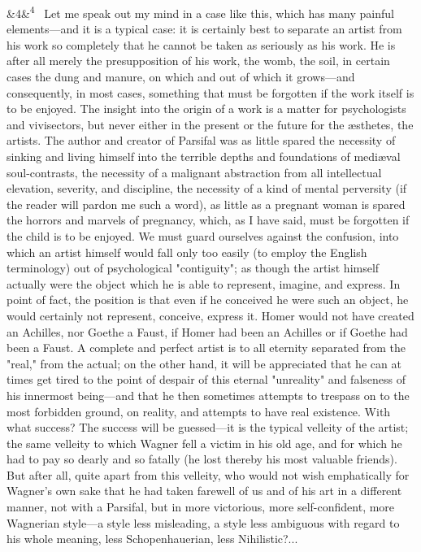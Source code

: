\documentclass[12pt]{article}
\newcommand{\para}[1][]{\par\noindent\ifx&#1&\else\textsuperscript{\footnotesize #1}~\fi}
\begin{document}
\para[4] Let me speak out my mind in a case like this, which has many painful elements---and it is a typical case: it is certainly best to separate an artist from his work so completely that he cannot be taken as seriously as his work. He is after all merely the presupposition of his work, the womb, the soil, in certain cases the dung and manure, on which and out of which it grows---and consequently, in most cases, something that must be forgotten if the work itself is to be enjoyed. The insight into the origin of a work is a matter for psychologists and vivisectors, but never either in the present or the future for the æsthetes, the artists. The author and creator of Parsifal was as little spared the necessity of sinking and living himself into the terrible depths and foundations of mediæval soul-contrasts, the necessity of a malignant abstraction from all intellectual elevation, severity, and discipline, the necessity of a kind of mental perversity (if the reader will pardon me such a word), as little as a pregnant woman is spared the horrors and marvels of pregnancy, which, as I have said, must be forgotten if the child is to be enjoyed. We must guard ourselves against the confusion, into which an artist himself would fall only too easily (to employ the English terminology) out of psychological "contiguity"; as though the artist himself actually were the object which he is able to represent, imagine, and express. In point of fact, the position is that even if he conceived he were such an object, he would certainly not represent, conceive, express it. Homer would not have created an Achilles, nor Goethe a Faust, if Homer had been an Achilles or if Goethe had been a Faust. A complete and perfect artist is to all eternity separated from the "real," from the actual; on the other hand, it will be appreciated that he can at times get tired to the point of despair of this eternal "unreality" and falseness of his innermost being---and that he then sometimes attempts to trespass on to the most forbidden ground, on reality, and attempts to have real existence. With what success? The success will be guessed---it is the typical velleity of the artist; the same velleity to which Wagner fell a victim in his old age, and for which he had to pay so dearly and so fatally (he lost thereby his most valuable friends). But after all, quite apart from this velleity, who would not wish emphatically for Wagner's own sake that he had taken farewell of us and of his art in a different manner, not with a Parsifal, but in more victorious, more self-confident, more Wagnerian style---a style less misleading, a style less ambiguous with regard to his whole meaning, less Schopenhauerian, less Nihilistic?...
\end{document}
